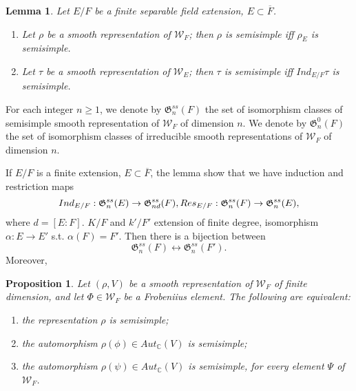 \documentclass[12pt,a4paper,english]{article}
\theoremstyle{definition}
\theoremstyle{plain}
\newtheorem*{lem}{Lemma}
\newtheorem{prop}{Proposition}
\begin{document}
\begin{lem}
Let $E/F$ be a finite separable field extension, $E\subset\overline{F}$.
\begin{enumerate}
    \item Let $\rho$ be a smooth representation of $\mathcal{W}_{F}$; then $\rho$ is semisimple iff $\rho_{E}$ is semisimple.
    \item Let $\tau$ be a smooth representation of $\mathcal{W}_{E}$; then $\tau$ is semisimple iff $Ind_{E/F}\tau$ is semisimple.
\end{enumerate}
\end{lem}
For each integer $n\geq1$, we denote by $\mathfrak{G}^{ss}_{n}(F)$ the set of isomorphism classes of semisimple smooth representation of $\mathcal{W}_{F}$ of dimension $n$. We denote by $\mathfrak{G}^{0}_{n}(F)$ the set of isomorphism classes of irreducible smooth representations of $\mathcal{W}_{F}$ of dimension $n$.

If $E/F$ is a finite extension, $E\subset\overline{F}$, the lemma show that we have induction and restriction maps
\begin{equation*}
    Ind_{E/F}:\mathfrak{G}^{ss}_{n}(E)\rightarrow\mathfrak{G}^{ss}_{nd}(F),\\
    Res_{E/F}:\mathfrak{G}^{ss}_{n}(F)\rightarrow\mathfrak{G}^{ss}_{n}(E),
\end{equation*}
where $d=[E:F]$.
$K/F$ and $k'/F'$ extension of finite degree, isomorphism $\alpha: E\rightarrow E'$ s.t. $\alpha(F)=F'$. Then there is a bijection between $$\mathfrak{G}^{ss}_{n}(F)\leftrightarrow \mathfrak{G}^{ss}_{n}(F').$$
Moreover,
\begin{center}
\end{center}
\begin{prop}
Let $(\rho,V)$ be a smooth representation of $\mathcal{W}_{F}$ of finite dimension, and let $\Phi\in \mathcal{W}_{F}$ be a Frobeniius element. The following are equivalent:
\begin{enumerate}
    \item the representation $\rho$ is semisimple;
    \item the automorphism $\rho(\phi)\in Aut_{\mathbb{C}}(V)$ is semisimple;
    \item the automorphism $\rho(\psi)\in Aut_{\mathbb{C}}(V)$ is semisimple, for every element $\Psi$ of $\mathcal{W}_{F}$.
\end{enumerate}
\end{prop}
\end{document}
